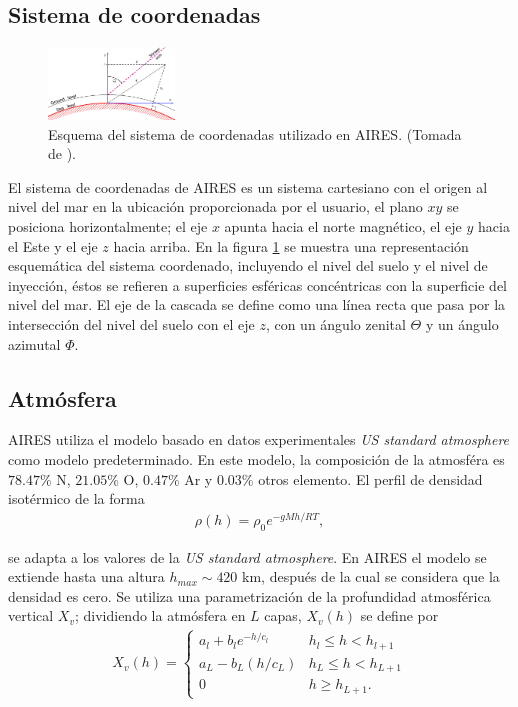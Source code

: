 	\subsection{Sistema de coordenadas}
	\begin{figure}
	\includegraphics[width=0.3\textwidth]{Figuras/coordinates} 
	\caption{Esquema del sistema de coordenadas utilizado en AIRES. (Tomada de \cite{Sciutto1999a}).}
	\label{fig:coordinates}
	\end{figure}		
	El sistema de coordenadas de AIRES es un sistema cartesiano con el origen al nivel del mar en la ubicación proporcionada por el usuario, el plano $xy$ se posiciona horizontalmente; el eje $x$ apunta hacia el norte magnético, el eje $y$ hacia el Este y el eje $z$ hacia arriba. En la figura \ref{fig:coordinates} se muestra una representación esquemática del sistema coordenado, incluyendo el nivel del suelo y el nivel de inyección, éstos se refieren a superficies esféricas concéntricas con la superficie del nivel del mar. El eje de la cascada se define como una línea recta que pasa por la intersección del nivel del suelo con el eje $z$, con un ángulo zenital $\Theta$ y un ángulo azimutal $\Phi$.
	
	\subsection{Atmósfera}
	AIRES utiliza el modelo basado en datos experimentales \textit{US standard atmosphere} como modelo predeterminado. En este modelo, la composición de la atmosféra es $78.47\%$ N, $21.05\%$ O, $0.47\%$ Ar y $0.03\%$ otros elemento. El perfil de densidad isotérmico de la forma
	\begin{align*}
	\rho (h) = \rho_0 e^{-gMh/RT},
	\end{align*}
	
	se adapta a los valores de la \textit{US standard atmosphere}. En AIRES el modelo se extiende hasta una altura $h_{max} \sim 420$ km, después de la cual se considera que la densidad es cero. Se utiliza una parametrización de la profundidad atmosférica vertical $X_v$; dividiendo la atmósfera en $L$ capas, $X_v (h)$ se define por 
	\begin{align}
	X_v (h) = \begin{cases}
	a_l + b_l e^{-h/c_l} & h_l \leq h < h_{l+1} \\
	a_L - b_L (h/c_L) & h_L \leq h < h_{L+1} \\
	0 & h \geq h_{L+1}.
	\end{cases}
	\end{align}
	
